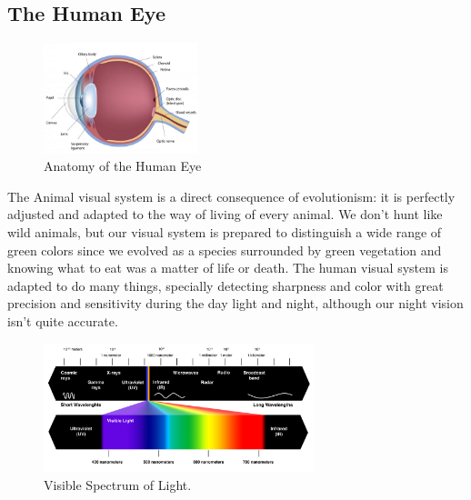 \subsection{The Human Eye}
\label{sec:humaneye}
%
\begin{figure}
	\begin{center}
    \vspace{-2\baselineskip}
	\includegraphics[width=0.4\textwidth]{images/background/Eye_Anatomy.jpg}
	\end{center}
    \caption[The Human Eye]{Anatomy of the Human Eye\protect\footnotemark{}}
    \label{fig:eye}
\end{figure}
%
The Animal visual system is a direct consequence of evolutionism: it is perfectly adjusted and adapted
to the way of living of every animal. We don’t hunt like wild animals, but our visual system is
prepared to distinguish a wide range of green colors since we evolved as a species surrounded by green
vegetation and knowing what to eat was a matter of life or death. The human visual system is adapted
to do many things, specially detecting sharpness and color with great precision and sensitivity during
the day light and night, although our night vision isn’t quite accurate. \par
%
\begin{figure}[H]
	\centering
    \vspace{-15pt}
	\includegraphics[width=0.7\textwidth]{images/background/Visible-spectrum.jpg}
    \caption[Visible Spectrum of Light]{Visible Spectrum of Light.\protect\footnotemark{}}
    \vspace{-15pt}
    \label{fig:lightspectrum}
\end{figure}
